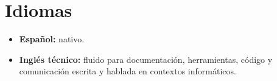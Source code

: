 \section{Idiomas}

\begin{itemize}
  \item \textbf{Español:} nativo.
  \item \textbf{Inglés técnico:} fluido para documentación, herramientas, código y comunicación escrita y hablada en contextos informáticos.
\end{itemize}

